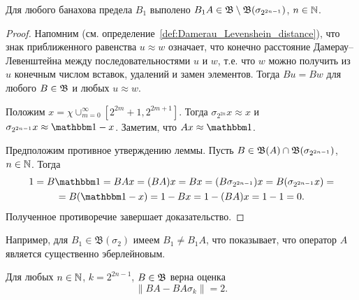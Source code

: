 \begin{lemma}
	Для любого банахова предела $B_1$ выполено $B_1 A \in \mathfrak B \setminus \mathfrak{B} (\sigma_{2^{2n-1}})$, $n\in \mathbb{N}$.
\end{lemma}

\begin{proof}
	Напомним (см. определение~\ref{def:Damerau_Levenshein_distance}), что знак приближенного равенства $ u \approx w$ означает,
	что конечно расстояние Дамерау--Левенштейна между последовательностями
	$u$ и $w$,
	т.е. что $w$ можно получить из $u$ конечным числом вставок, удалений и замен элементов.
	Тогда $Bu = Bw$ для любого $B\in\mathfrak{B}$ и любых $u \approx w$.

	Положим $x = \chi {\cup_{m=0}^{\infty}\left[2^{2 m}+1, 2^{2 m+1}\right]}$.
	Тогда $\sigma_{2^{2n}} x \approx x$ и $\sigma_{2^{2n-1}} x \approx \one - x$.
	Заметим, что $Ax \approx \one$.

	Предположим противное утверждению леммы.
	Пусть $B \in \mathfrak{B}(A) \cap \mathfrak{B} (\sigma_{2^{2n-1}})$, $n\in \mathbb{N}$.
	Тогда
	\begin{multline}
		1 = B\one = BAx = (BA)x = Bx =
		(B\sigma_{2^{2n-1}}) x = B (\sigma_{2^{2n-1}} x) =
		\\=
		B(\one -x) = 1 - Bx = 1 - (BA)x = 1-1 = 0
		.
	\end{multline}
	Полученное противоречие завершает доказательство.
\end{proof}

\begin{remark}
	Например, для $B_1 \in \mathfrak B (\sigma_2)$ имеем $B_1 \ne B_1 A$, что показывает,
	что оператор $A$ является существенно эберлейновым.
\end{remark}

\begin{theorem}
	Для любых $n\in\mathbb{N}$, $k=2^{2n-1}$, $B\in\mathfrak{B}$ верна оценка
	\begin{equation}
		\|BA-BA\sigma_k\| = 2
		.
	\end{equation}
\end{theorem}

